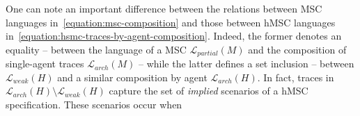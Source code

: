 One can note an important difference between the relations between MSC languages in~\ref{equation:msc-composition} and those between hMSC languages in~\ref{equation:hsmc-traces-by-agent-composition}. Indeed, the former denotes an equality -- between the language of a MSC $\mathcal{L}_{partial}(M)$ and the composition of single-agent traces $\mathcal{L}_{arch}(M)$ -- while the latter defines a set inclusion -- between $\mathcal{L}_{weak}(H)$ and a similar composition by agent $\mathcal{L}_{arch}(H)$. In fact, traces in $\mathcal{L}_{arch}(H) \setminus \mathcal{L}_{weak}(H)$ capture the set of \emph{implied} scenarios of a hMSC specification. These scenarios occur when  
